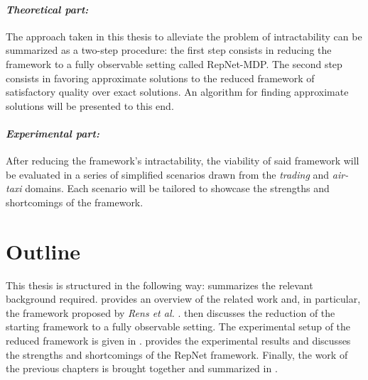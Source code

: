 \paragraph*{\textit{Theoretical part:}} The approach taken in this thesis to alleviate the problem of intractability can be summarized as a two-step procedure: the first step consists in reducing the framework to a fully observable setting called RepNet-MDP. The second step consists in favoring approximate solutions to the reduced framework of satisfactory quality over exact solutions. An algorithm for finding approximate solutions will be presented to this end.

\paragraph*{\textit{Experimental part:}} After reducing the framework's intractability, the viability of said framework will be evaluated in a series of simplified scenarios drawn from the \textit{trading} and \textit{air-taxi} domains. Each scenario will be tailored to showcase the strengths and shortcomings of the framework.



\section{Outline}
This thesis is structured in the following way:  summarizes the relevant background required.  provides an overview of the related work and, in particular, the framework proposed by \textit{Rens et al.} \cite{rensetal}.  then discusses the reduction of the starting framework to a fully observable setting. The experimental setup of the reduced framework is given in .  provides the experimental results and discusses the strengths and shortcomings of the RepNet framework. Finally, the work of the previous chapters is brought together and summarized in .
